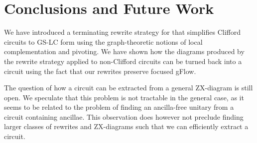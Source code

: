 \documentclass[a4paper,onecolumn,superscriptaddress,11pt,accepted=2020-04-27]{quantumarticle}
\theoremstyle{definition}
\begin{document}


%

\section{Conclusions and Future Work}\label{sec:conclusion}
We have introduced a terminating rewrite strategy for \zxdiagrams that simplifies Clifford circuits to GS-LC form using the graph-theoretic notions of local complementation and pivoting. We have shown how the diagrams produced by the rewrite strategy applied to non-Clifford circuits can be turned back into a circuit using the fact that our rewrites preserve focused gFlow. 

The question of how a circuit can be extracted from a general ZX-diagram is still open. We speculate that this problem is not tractable in the general case, as it seems to be related to the problem of finding an ancilla-free unitary from a circuit containing ancillae. This observation does however not preclude finding larger classes of rewrites and ZX-diagrams such that we can efficiently extract a circuit. 
\end{document}
